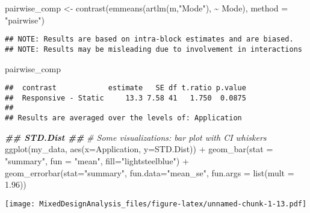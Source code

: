 \documentclass[
]{article}
\newenvironment{Shaded}{\begin{snugshade}}{\end{snugshade}}
\newcommand{\AttributeTok}[1]{\textcolor[rgb]{0.77,0.63,0.00}{#1}}
\newcommand{\CommentTok}[1]{\textcolor[rgb]{0.56,0.35,0.01}{\textit{#1}}}
\newcommand{\DocumentationTok}[1]{\textcolor[rgb]{0.56,0.35,0.01}{\textbf{\textit{#1}}}}
\newcommand{\FloatTok}[1]{\textcolor[rgb]{0.00,0.00,0.81}{#1}}
\newcommand{\FunctionTok}[1]{\textcolor[rgb]{0.00,0.00,0.00}{#1}}
\newcommand{\NormalTok}[1]{#1}
\newcommand{\OtherTok}[1]{\textcolor[rgb]{0.56,0.35,0.01}{#1}}
\newcommand{\SpecialCharTok}[1]{\textcolor[rgb]{0.00,0.00,0.00}{#1}}
\newcommand{\StringTok}[1]{\textcolor[rgb]{0.31,0.60,0.02}{#1}}
\begin{document}
\begin{Shaded}
\begin{Highlighting}[]
\NormalTok{pairwise\_comp }\OtherTok{\textless{}{-}} \FunctionTok{contrast}\NormalTok{(}\FunctionTok{emmeans}\NormalTok{(}\FunctionTok{artlm}\NormalTok{(m,}\StringTok{"Mode"}\NormalTok{), }\SpecialCharTok{\textasciitilde{}}\NormalTok{ Mode), }\AttributeTok{method =} \StringTok{"pairwise"}\NormalTok{)}
\end{Highlighting}
\end{Shaded}

\begin{verbatim}
## NOTE: Results are based on intra-block estimates and are biased.
## NOTE: Results may be misleading due to involvement in interactions
\end{verbatim}

\begin{Shaded}
\begin{Highlighting}[]
\NormalTok{pairwise\_comp}
\end{Highlighting}
\end{Shaded}

\begin{verbatim}
##  contrast            estimate   SE df t.ratio p.value
##  Responsive - Static     13.3 7.58 41   1.750  0.0875
## 
## Results are averaged over the levels of: Application
\end{verbatim}

\begin{Shaded}
\begin{Highlighting}[]
\DocumentationTok{\#\# STD.Dist \#\#}
\CommentTok{\# Some visualizations: bar plot with CI whiskers }
\FunctionTok{ggplot}\NormalTok{(my\_data, }\FunctionTok{aes}\NormalTok{(}\AttributeTok{x=}\NormalTok{Application, }\AttributeTok{y=}\NormalTok{STD.Dist)) }\SpecialCharTok{+} \FunctionTok{geom\_bar}\NormalTok{(}\AttributeTok{stat =} \StringTok{"summary"}\NormalTok{, }\AttributeTok{fun =} \StringTok{"mean"}\NormalTok{, }\AttributeTok{fill=}\StringTok{"lightsteelblue"}\NormalTok{) }\SpecialCharTok{+} \FunctionTok{geom\_errorbar}\NormalTok{(}\AttributeTok{stat=}\StringTok{"summary"}\NormalTok{, }\AttributeTok{fun.data=}\StringTok{"mean\_se"}\NormalTok{, }\AttributeTok{fun.args =} \FunctionTok{list}\NormalTok{(}\AttributeTok{mult =} \FloatTok{1.96}\NormalTok{))}
\end{Highlighting}
\end{Shaded}

\texttt{[image: MixedDesignAnalysis\_files/figure-latex/unnamed-chunk-1-13.pdf]}
\end{document}
